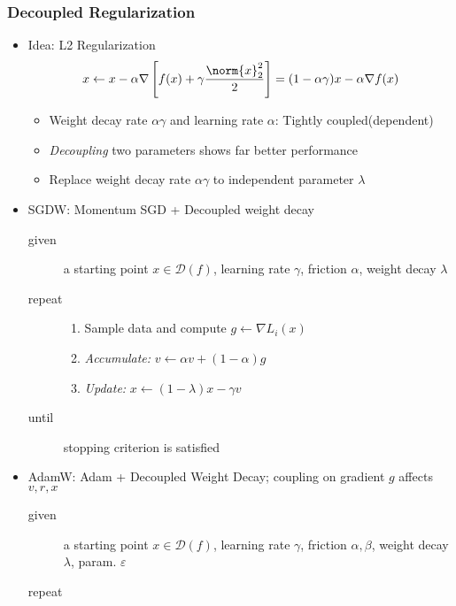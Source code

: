 \subsubsection*{Decoupled Regularization}
\begin{itemize}
    \item Idea: L2 Regularization
    \begin{equation}
        x\leftarrow x-\alpha\nabla\left[f(x)+\gamma\frac{\norm{x}_2^2}{2}\right]=(1-\alpha\gamma)x-\alpha\nabla f(x)
    \end{equation}
    \begin{itemize}
        \item Weight decay rate $\alpha\gamma$ and learning rate $\alpha$: Tightly coupled(dependent)
        \item \textit{Decoupling} two parameters shows far better performance
        \item Replace weight decay rate $\alpha\gamma$ to independent parameter $\lambda$
    \end{itemize}
    \item SGDW: Momentum SGD + Decoupled weight decay
    \begin{description}
        \item[given] a starting point $x\in\mathcal{D}(f)$, learning rate $\gamma$, friction $\alpha$, weight decay $\lambda$
        \item[repeat] \phantom{}
        \begin{enumerate}
            \item Sample data and compute $g\leftarrow\nabla L_i(x)$
            \item \textit{Accumulate:} $v\leftarrow\alpha v+(1-\alpha)g$
            \item \textit{Update:} $x\leftarrow (1-\lambda)x-\gamma v$
        \end{enumerate}
        \item[until] stopping criterion is satisfied
    \end{description}
    \item AdamW: Adam + Decoupled Weight Decay; coupling on gradient $g$ affects $v,r,x$
    \begin{description}
        \item[given] a starting point $x\in\mathcal{D}(f)$, learning rate $\gamma$, friction $\alpha,\beta$, weight decay $\lambda$, param. $\varepsilon$
        \item[repeat] \phantom{}
        \begin{enumerate}

\end{enumerate}
\end{description}
\end{itemize}
